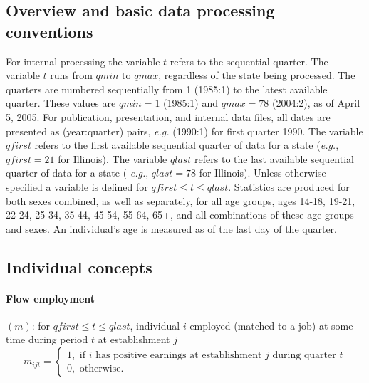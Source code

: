 
%
%

\subsection{Overview and basic data processing conventions}
\label{sec:technical:overview}

 For internal processing the variable $t$ refers
to the sequential quarter. The variable $t$ runs from $qmin$ to $qmax$,
regardless of the state being processed. The quarters are numbered
sequentially from 1 (1985:1) to the latest available quarter. These values
are $qmin=1$ (1985:1) and $qmax=78$ (2004:2), as of April 5, 2005. For
publication, presentation, and internal data files, all dates are presented
as (year:quarter) pairs, \textit{e.g.} (1990:1) for first quarter 1990. The
variable $qfirst$ refers to the first available sequential quarter of data
for a state (\textit{e.g.}, $qfirst=21$ for Illinois). The variable $qlast$
refers to the last available sequential quarter of data for a state (\textit{%
e.g.}, $qlast=78$ for Illinois). Unless otherwise specified a variable is
defined for $qfirst\leq t\leq qlast.$ Statistics are produced for both sexes
combined, as well as separately, for all age groups, ages 14-18, 19-21,
22-24, 25-34, 35-44, 45-54, 55-64, 65+, and all combinations of these age
groups and sexes. An individual's age is measured as
of the last day of the quarter.

\subsection{Individual concepts}
\label{sec:technical:individual}

\paragraph{Flow employment}

$\left( m\right) $: for $qfirst\leq t\leq qlast$, individual $i$ employed
(matched to a job) at some time during period $t$ at establishment $j$%
\begin{equation}
m_{ijt}=\left\{ 
\begin{array}{l}
1,%
\text{ if }i\text{ has positive earnings at establishment }j\text{ during
quarter }t \\ 
0,\text{ otherwise.}%
\end{array}%
\right.  \label{eq:mijt}
\end{equation}

